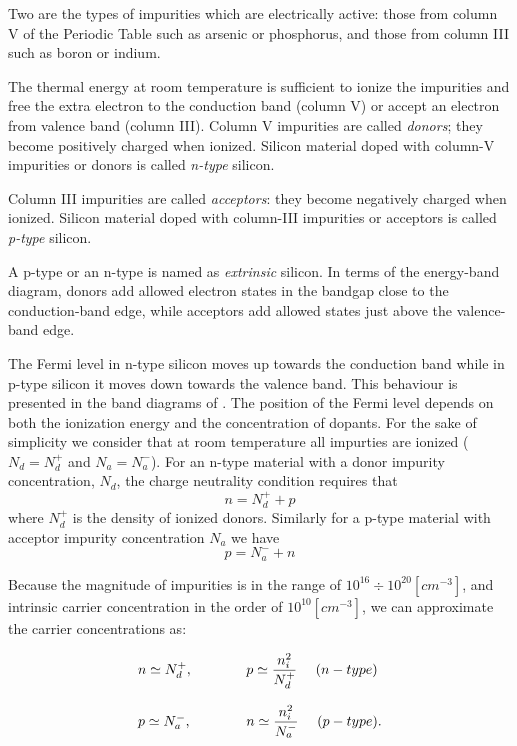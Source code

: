 Two are the types of impurities which are electrically active: those from column V of the Periodic Table such as arsenic or phosphorus, and those from column III such as boron or indium.

The thermal energy at room temperature is sufficient to ionize the impurities and free the extra electron to the conduction band (column V) or accept an electron from valence band (column III). Column V impurities are called \textit{donors}; they become positively charged when ionized. Silicon material doped with column-V impurities or donors is called \textit{n-type} silicon.

Column III impurities are called \textit{acceptors}: they become negatively charged when ionized. Silicon material doped with column-III impurities or acceptors is called \textit{p-type} silicon.

A p-type or an n-type is named as \textit{extrinsic} silicon.
In terms of the energy-band diagram, donors add allowed electron states in the bandgap close to the conduction-band edge, while acceptors add allowed states just above the valence-band edge.

The Fermi level in n-type silicon moves up towards the conduction band while in p-type silicon it moves down towards the valence band. This behaviour is presented in the band diagrams of .
The position of the Fermi level depends on both the ionization energy and the concentration of dopants. For the sake of simplicity we consider that at room temperature all impurties are ionized ($N_d = N_d^+$ and $N_a = N_a^-$).  For an n-type material with a donor impurity concentration, $N_d$, the charge neutrality condition requires that
\begin{equation}
\label{eq: equilibrium charge in n-type}
n = N_d^+ + p
\end{equation}
 where $N_d^+$ is the density of ionized donors.  Similarly for a p-type material with acceptor impurity concentration $N_a$ we have
\begin{equation}
\label{eq: equilibrium charge in p-type}
p = N_a^- + n
\end{equation}
 
 Because the magnitude of impurities is in the range of $10^{16}\div 10^{20} [cm^{-3}]$, and intrinsic carrier concentration in the order of $10^{10}[cm^{-3}]$, we can approximate the carrier concentrations as:
  
\begin{equation}
\label{eq: equilibiurm approximation}
\begin{array}{lcl}
n \simeq N_d^+,&\qquad & p \simeq \dfrac{n_i^2}{N_d^+} \psp{8} (n-type)\\ \\
p \simeq N_a^-,& \qquad & n \simeq \dfrac{n_i^2}{N_a^-} \psp{8} (p-type).
\end{array}
\end{equation}

